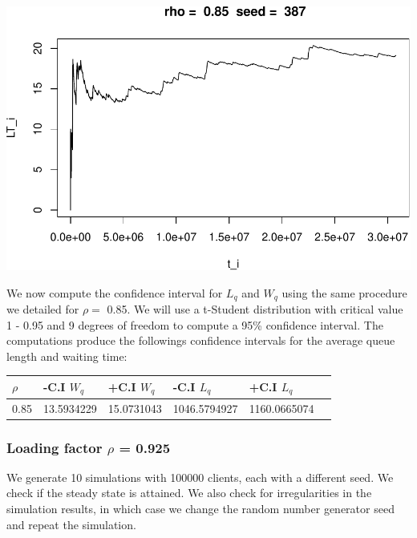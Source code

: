 \documentclass[]{article}
\begin{document}
\includegraphics{003_files/figure-latex/unnamed-chunk-20-10.pdf}

We now compute the confidence interval for \(L_{q}\) and \(W_{q}\) using
the same procedure we detailed for \(\rho =\) 0.85. We will use a
t-Student distribution with critical value 1 - 0.95 and 9 degrees of
freedom to compute a 95\% confidence interval. The computations produce
the followings confidence intervals for the average queue length and
waiting time:

\begin{longtable}[]{@{}llllll@{}}
\toprule
\(\rho\) & -C.I \(W_{q}\) & +C.I \(W_{q}\) & -C.I \(L_{q}\) & +C.I
\(L_{q}\) &\tabularnewline
\midrule
\endhead
0.85 & 13.5934229 & 15.0731043 & 1046.5794927 &
1160.0665074\tabularnewline
\bottomrule
\end{longtable}

\subsubsection{\texorpdfstring{Loading factor \(\rho\) =
0.925}{Loading factor \textbackslash{}rho = 0.925}}\label{loading-factor-rho-0.925}

We generate 10 simulations with 100000 clients, each with a different
seed. We check if the steady state is attained. We also check for
irregularities in the simulation results, in which case we change the
random number generator seed and repeat the simulation.
\end{document}
